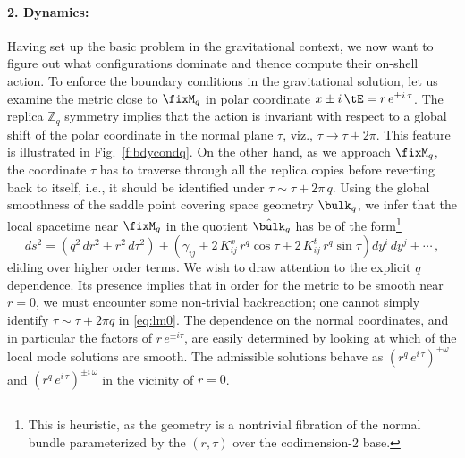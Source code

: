 \documentclass[12pt,openany]{book}
\begin{document}
\paragraph{2. Dynamics:} Having set up the basic problem in the gravitational context, we now want to figure out what configurations dominate and thence compute their on-shell action.  To enforce the boundary conditions in the gravitational solution, let us examine the metric close to $\fixM_q$ in polar coordinate
 $x \pm i\,\tE= r \,e^{\pm i \,\tau}$.  The replica  ${\mathbb Z}_q$ symmetry implies that the action is invariant with respect to a global shift of the polar coordinate in the normal plane $\tau$, viz., $\tau \to \tau + 2\pi$. This feature is illustrated in  Fig.~\ref{f:bdycondq}. On the other hand, as we approach $\fixM_q$, the coordinate $\tau$ has to traverse through all the replica copies before reverting back to itself, i.e., it should be identified under $\tau \sim \tau + 2\pi\,q$. Using the global smoothness of the saddle point covering space geometry $\bulk_q$, we infer that the local spacetime near $\fixM_q$ in the quotient ${\hat \bulk}_q$ has be of the form\footnote{  This is heuristic, as the geometry is a nontrivial fibration of the normal bundle parameterized by the $(r,\tau)$ over the codimension-2 base.}
%
\begin{equation}
ds^2 =
         \left( q^2 \, dr ^2+ r^2 \, d\tau^2\right)+
        \left(\gamma_{i j}+2\, K_{ i j}^x\, r^q\cos \tau+2\, K_{ i j}^t\, r^q \sin \tau \right) dy^i \, dy^j  + \cdots
\,,
\label{eq:lm2}
\end{equation}
%
eliding over higher order terms. We wish to draw attention to the explicit $q$ dependence. Its presence implies that in order for  the metric to be smooth near $r=0$, we must encounter some non-trivial backreaction;  one cannot simply identify  $\tau \sim \tau+2\pi q$ in \eqref{eq:lm0}. The dependence on the normal coordinates, and in particular the factors of $r \, e^{\pm i\tau}$, are easily determined  by looking at which of the local mode solutions are smooth. The admissible solutions behave as   $(r^q \, e^{i\,\tau})^{\pm \omega }$ and
$(r^q \, e^{i\,\tau})^{\pm i\,\omega }$ in the vicinity of $r=0$.
\end{document}
